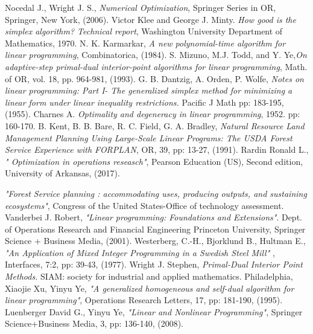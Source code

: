 \documentclass[a4paper,10 pt,titlepage,twoside]{book}
\theoremstyle{plain}
\theoremstyle{definition}
\theoremstyle{remark}
\begin{document}
\begin{thebibliography}{9}
	Nocedal J., Wright J. S., \emph{\;Numerical Optimization}, Springer Series in OR, Springer, New York, (2006).
	Victor Klee and George J. Minty.\emph{ How good is the simplex algorithm? Technical report}, Washington University Department of Mathematics, 1970.
	 N. K. Karmarkar,\emph{ A new polynomial-time algorithm for linear programming}, Combinatorica, (1984).
	 S. Mizuno, M.J. Todd, and Y. Ye,\emph{\;On adaptive-step primal-dual interior-point algorithms for linear programming}, Math. of OR, vol. 18, pp. 964-981, (1993). 
	 G. B. Dantzig, A. Orden, P. Wolfe, \emph{ Notes on linear programming: Part I- The generalized simplex method for
	minimizing a linear form under linear inequality restrictions.} Pacific J Math pp: 183-195, (1955). 
	  Charnes A. \emph{ Optimality and degeneracy in linear programming}, 1952. pp: 160-170. 
	 B. Kent, B. B. Bare, R. C. Field, G. A. Bradley, \textit{Natural Resource Land Management Planning Using Large-Scale Linear Programs: The USDA Forest Service Experience with FORPLAN}, OR, 39, pp: 13-27, (1991).
 Rardin Ronald L., \textit{" Optimization in operations reseasch"}, Pearson Education (US), Second edition, University of Arkansas, (2017).

 \emph{"Forest Service planning : accommodating uses, producing outputs, and sustaining ecosystems"}, Congress of the United States-Office of technology assessment.
	 Vanderbei J. Robert, \emph{\;"Linear programming:
	Foundations and Extensions"}. Dept. of Operations Research and Financial Engineering
Princeton University, Springer Science + Business Media, (2001).
 Westerberg, C.-H., Bjorklund B., Hultman E., \emph{"An Application of Mixed Integer Programming in a Swedish Steel Mill" }, Interfaces, 7:2, pp: 39-43, (1977).
 Wright J. Stephen, \emph{\;Primal-Dual Interior Point Methods.} SIAM: society for industrial and applied mathematics. Philadelphia, %
Xiaojie Xu, Yinyu Ye, \emph{"A generalized homogeneous and self-dual algorithm for linear programming"}, Operations Research Letters, 17, pp: 181-190, (1995).
Luenberger David G., Yinyu Ye, \emph{"Linear and Nonlinear Programming"}, Springer Science+Business Media, 3, pp: 136-140, (2008).


\end{thebibliography}
\end{document}
